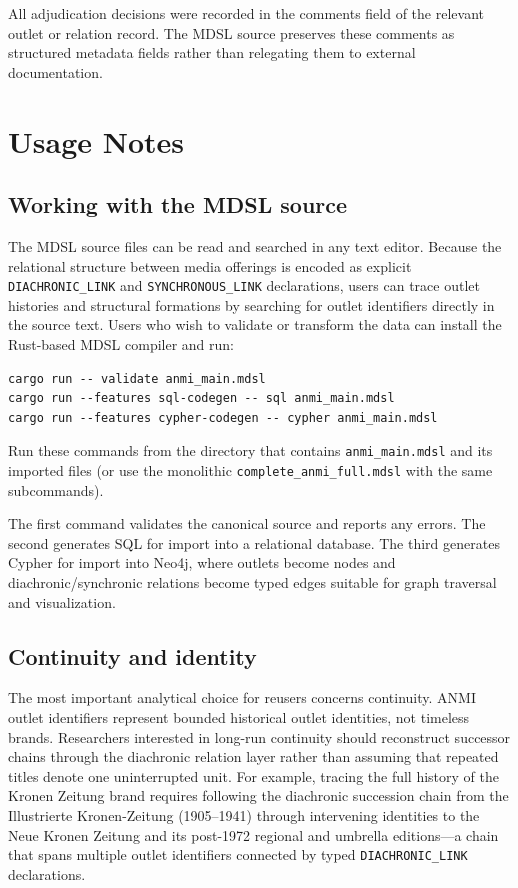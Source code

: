 \documentclass[11pt]{article}
\begin{document}
All adjudication decisions were recorded in the comments field of the relevant outlet or relation record. The MDSL source preserves these comments as structured metadata fields rather than relegating them to external documentation.

\section{Usage Notes}

\subsection{Working with the MDSL source}

The MDSL source files can be read and searched in any text editor. Because the relational structure between media offerings is encoded as explicit \texttt{DIACHRONIC\_LINK} and \texttt{SYNCHRONOUS\_LINK} declarations, users can trace outlet histories and structural formations by searching for outlet identifiers directly in the source text. Users who wish to validate or transform the data can install the Rust-based MDSL compiler and run:

\begin{verbatim}
cargo run -- validate anmi_main.mdsl
cargo run --features sql-codegen -- sql anmi_main.mdsl
cargo run --features cypher-codegen -- cypher anmi_main.mdsl
\end{verbatim}
\noindent Run these commands from the directory that contains \texttt{anmi\_main.mdsl} and its imported files (or use the monolithic \texttt{complete\_anmi\_full.mdsl} with the same subcommands).

The first command validates the canonical source and reports any errors. The second generates SQL for import into a relational database. The third generates Cypher for import into Neo4j, where outlets become nodes and diachronic/synchronic relations become typed edges suitable for graph traversal and visualization.

\subsection{Continuity and identity}

The most important analytical choice for reusers concerns continuity. ANMI outlet identifiers represent bounded historical outlet identities, not timeless brands. Researchers interested in long-run continuity should reconstruct successor chains through the diachronic relation layer rather than assuming that repeated titles denote one uninterrupted unit. For example, tracing the full history of the Kronen Zeitung brand requires following the diachronic succession chain from the Illustrierte Kronen-Zeitung (1905--1941) through intervening identities to the Neue Kronen Zeitung and its post-1972 regional and umbrella editions---a chain that spans multiple outlet identifiers connected by typed \texttt{DIACHRONIC\_LINK} declarations.
\end{document}

